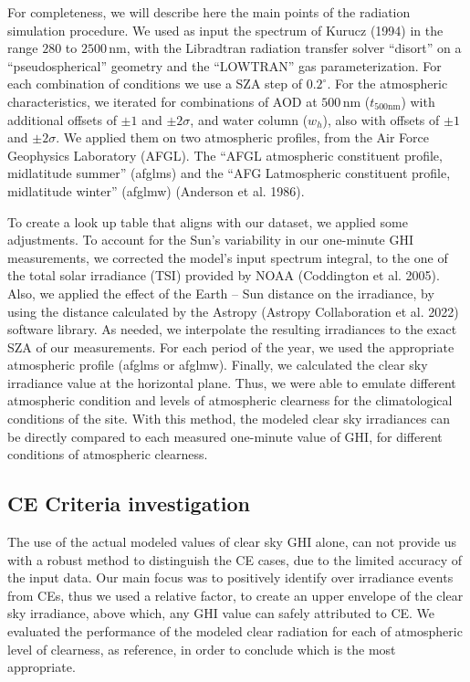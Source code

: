 \documentclass[
]{article}
\begin{document}
For completeness, we will describe here the main points of the radiation simulation
procedure. We used as input the spectrum of Kurucz (1994) in the range \(280\) to
\(2500\,\text{nm}\), with the Libradtran radiation transfer solver ``disort'' on a
``pseudospherical'' geometry and the ``LOWTRAN'' gas parameterization. For each
combination of conditions we use a SZA step of \(0.2^\circ\).
For the atmospheric characteristics, we iterated for combinations of AOD at
\(500\,\text{nm}\) (\(t_{500\text{nm}}\)) with additional offsets of \(\pm1\) and
\(\pm2\sigma\), and water column (\(w_h\)), also with offsets of \(\pm1\) and \(\pm2\sigma\).
We applied them on two atmospheric profiles, from the Air Force Geophysics
Laboratory (AFGL). The ``AFGL atmospheric constituent profile, midlatitude summer''
(afglms) and the ``AFG Latmospheric constituent profile, midlatitude winter'' (afglmw)
(Anderson et al. 1986).

To create a look up table that aligns with our dataset, we applied some adjustments.
To account for the Sun's variability in our one-minute GHI measurements, we corrected
the model's input spectrum integral, to the one of the total solar irradiance (TSI)
provided by NOAA (Coddington et al. 2005). Also, we applied the effect of the Earth -- Sun
distance on the irradiance, by using the distance calculated by the Astropy
(Astropy Collaboration et al. 2022) software library. As needed, we interpolate the resulting
irradiances to the exact SZA of our measurements. For each period of the year, we
used the appropriate atmospheric profile (afglms or afglmw). Finally, we calculated
the clear sky irradiance value at the horizontal plane. Thus, we were able to
emulate different atmospheric condition and levels of atmospheric clearness for the
climatological conditions of the site. With this method, the modeled clear sky
irradiances can be directly compared to each measured one-minute value of GHI, for
different conditions of atmospheric clearness.

\hypertarget{ce-criteria-investigation}{%
\subsection{CE Criteria investigation}\label{ce-criteria-investigation}}

The use of the actual modeled values of clear sky GHI alone, can not provide us with
a robust method to distinguish the CE cases, due to the limited accuracy of the input
data. Our main focus was to positively identify over irradiance events from CEs, thus
we used a relative factor, to create an upper envelope of the clear sky irradiance,
above which, any GHI value can safely attributed to CE. We evaluated the performance
of the modeled clear radiation for each of atmospheric level of clearness, as
reference, in order to conclude which is the most appropriate.
\end{document}
